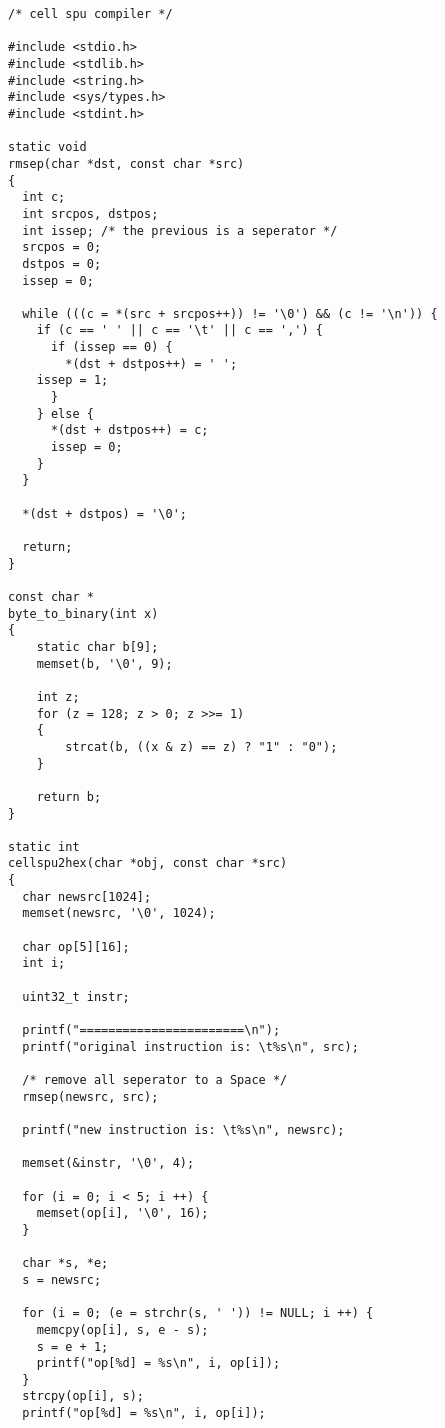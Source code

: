 \documentclass[preprint,authoryear,12pt]{elsarticle}
\begin{document}
\begin{verbatim}
/* cell spu compiler */

#include <stdio.h>
#include <stdlib.h>
#include <string.h>
#include <sys/types.h>
#include <stdint.h>

static void
rmsep(char *dst, const char *src)
{
  int c;
  int srcpos, dstpos;
  int issep; /* the previous is a seperator */
  srcpos = 0;
  dstpos = 0;
  issep = 0;

  while (((c = *(src + srcpos++)) != '\0') && (c != '\n')) {
    if (c == ' ' || c == '\t' || c == ',') {
      if (issep == 0) {
        *(dst + dstpos++) = ' ';
	issep = 1;
      }
    } else {
      *(dst + dstpos++) = c;
      issep = 0;
    }
  }

  *(dst + dstpos) = '\0';

  return;
}

const char *
byte_to_binary(int x)
{
    static char b[9];
    memset(b, '\0', 9);

    int z;
    for (z = 128; z > 0; z >>= 1)
    {
        strcat(b, ((x & z) == z) ? "1" : "0");
    }

    return b;
}

static int
cellspu2hex(char *obj, const char *src)
{
  char newsrc[1024];
  memset(newsrc, '\0', 1024);

  char op[5][16];
  int i;

  uint32_t instr;

  printf("=======================\n");
  printf("original instruction is: \t%s\n", src);

  /* remove all seperator to a Space */
  rmsep(newsrc, src);

  printf("new instruction is: \t%s\n", newsrc);

  memset(&instr, '\0', 4);

  for (i = 0; i < 5; i ++) {
    memset(op[i], '\0', 16);
  }

  char *s, *e;
  s = newsrc;

  for (i = 0; (e = strchr(s, ' ')) != NULL; i ++) {
    memcpy(op[i], s, e - s);
    s = e + 1;
    printf("op[%d] = %s\n", i, op[i]);
  }
  strcpy(op[i], s);
  printf("op[%d] = %s\n", i, op[i]);


\end{verbatim}
\end{document}
